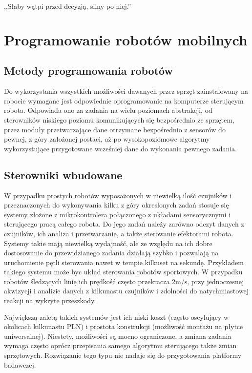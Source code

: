 

\begin{savequote}[70mm]
,,Słaby wątpi przed decyzją, silny po niej.''
\end{savequote}


\chapter{Programowanie robotów mobilnych}
\label{chap:programowanie}

\section{Metody programowania robotów}

Do wykorzystania wszystkich możliwości dawanych przez sprzęt zainstalowany na robocie
wymagane jest odpowiednie oprogramowanie na komputerze sterującym robota. Odpowiada
ono za zadania na wielu poziomach abstrakcji, od sterowników niskiego poziomu
komunikujących się bezpośrednio ze sprzętem, przez moduły przetwarzające dane otrzymane
bezpośrednio z sensorów do pewnej, z góry założonej postaci, aż po wysokopoziomowe
algorytmy wykorzystujące przygotowane wcześniej dane do wykonania pewnego zadania.

\section{Sterowniki wbudowane}

W przypadku prostych robotów wyposażonych w niewielką ilość czujników
i przeznaczonych do wykonywania kilku z góry okreslonych zadań stosuje się systemy
złożone z mikrokontrolera połączonego z układami sensorycznymi i sterującego pracą
całego robota. Do jego zadań należy zarówno odczyt danych z czujników, ich analiza
i przetwarzanie, a także sterowanie efektorami robota. Systemy takie mają niewielką
wydajność, ale ze względu na ich dobre dostosowanie do przewidzianego zadania działają
szybko i pozwalają na uruchomienie pętli sterowania nawet w tempie kilkuset na sekundę.
Przykładem takiego systemu może byc układ sterowania robotów sportowych. W przypadku
robotów śledzących linię ich prędkość często przekracza 2m/s, przy jednoczesnej
akwizycji i analizie danych z kilkunastu czujników i zdolności do natychmiastowej
reakcji na wykryte przeszkody.

Największą zaletą takich systemów jest ich niski koszt (często oscylujący w okolicach
kilkunastu PLN) i prostota konstrukcji (możliwość montażu na płytce uniwersalnej).
Niestety, możliwości są mocno ograniczone, a zmiana zadania wymaga często oprócz przepisania
samego algorytmu sterującego także zmian sprzętowych. Rozwiązanie tego typu nie nadaje
się do przygotowania platformy badawczej.

